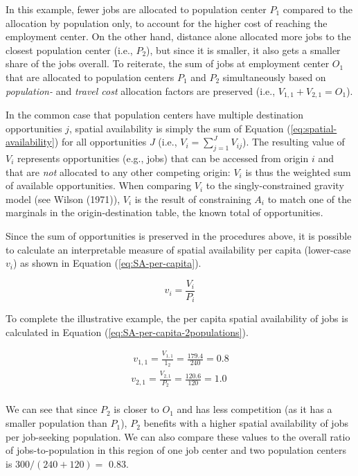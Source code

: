 \documentclass[]{elsarticle} %
\begin{document}
In this example, fewer jobs are allocated to population center \(P_1\)
compared to the allocation by population only, to account for the higher
cost of reaching the employment center. On the other hand, distance
alone allocated more jobs to the closest population center (i.e.,
\(P_2\)), but since it is smaller, it also gets a smaller share of the
jobs overall. To reiterate, the sum of jobs at employment center \(O_1\)
that are allocated to population centers \(P_1\) and \(P_2\)
simultaneously based on \emph{population-} and \emph{travel cost}
allocation factors are preserved (i.e., \(V_{1,1} + V_{2,1} = O_1\)).

In the common case that population centers have multiple destination
opportunities \(j\), spatial availability is simply the sum of Equation
(\ref{eq:spatial-availability}) for all opportunities \(J\) (i.e.,
\(V_i = \sum_{j=1}^J V_{ij}\)). The resulting value of \(V_i\)
represents opportunities (e.g., jobs) that can be accessed from origin
\(i\) and that are \emph{not} allocated to any other competing origin:
\(V_i\) is thus the weighted sum of available opportunities. When
comparing \(V_i\) to the singly-constrained gravity model (see Wilson
(1971)), \(V_i\) is the result of constraining \(A_i\) to match one of
the marginals in the origin-destination table, the known total of
opportunities.

Since the sum of opportunities is preserved in the procedures above, it
is possible to calculate an interpretable measure of spatial
availability per capita (lower-case \(v_i\)) as shown in Equation
(\ref{eq:SA-per-capita}).

\begin{equation}
\label{eq:SA-per-capita}
v_i = \frac{V_i}{P_i}
\end{equation}

To complete the illustrative example, the per capita spatial
availability of jobs is calculated in Equation
(\ref{eq:SA-per-capita-2populations}).

\begin{equation}
\label{eq:SA-per-capita-2populations}
\begin{array}{l}\
v_{1,1} = \frac{V_{1,1}}{1_2} =  \frac{179.4}{240} = 0.8\\
v_{2,1} =  \frac{V_{2,1}}{P_2} =  \frac{120.6}{120} = 1.0\\
\end{array}
\end{equation}

We can see that since \(P_2\) is closer to \(O_1\) and has less
competition (as it has a smaller population than \(P_1\)), \(P_2\)
benefits with a higher spatial availability of jobs per job-seeking
population. We can also compare these values to the overall ratio of
jobs-to-population in this region of one job center and two population
centers is \(300/(240 + 120)=\) 0.83.
\end{document}
